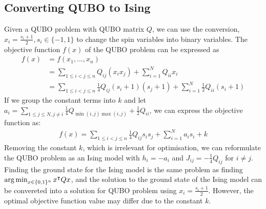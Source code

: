 \subsection{Converting QUBO to Ising}\label{qubotoising}
Given a QUBO problem with QUBO matrix $Q$, we can use the conversion, $x_i = \frac{s_i + 1}{2}, s_i \in \{-1, 1\}$ to change the spin variables into binary variables. The objective function $f(x)$ of the QUBO problem can be expressed as
\begin{align}
    f(x) &= f(x_1, ..., x_n) \nonumber\\
    &= \sum_{1\leq i < j \leq n} Q_{ij}(x_i x_j) + \sum_{i=1}^N Q_{ii} x_i \nonumber \\
    &= \sum_{1\leq i < j \leq n} \frac{1}{4} Q_{ij}(s_i + 1)(s_j + 1) + \sum_{i=1}^N \frac{1}{2} Q_{ii} (s_i + 1) \nonumber
\end{align}
If we group the constant terms into $k$ and let $a_i = \sum_{1\leq j \leq N, j \neq i} \frac{1}{4}Q_{\min(i,j)\max(i,j)} + \frac{1}{2}Q_{ii}$, we can express the objective function as:
\begin{align}
    f(x) = \sum_{1\leq i < j \leq n} \frac{1}{4} Q_{ij}s_i s_j + \sum_{i=1}^N a_i s_i + k \nonumber
\end{align}
Removing the constant $k$, which is irrelevant for optimisation, we can reformulate the QUBO problem as an Ising model with $h_i = -a_i$ and $J_{ij} = -\frac{1}{4}Q_{ij}$ for $i \neq j$. Finding the ground state for the Ising model is the same problem as finding $\operatorname*{arg\,min}_{x \in \{0, 1\}^n} x^\intercal Q x$, and the solution to the ground state of the Ising model can be convereted into a solution for QUBO problem using $x_i = \frac{s_i + 1}{2}$. However, the optimal objective function value may differ due to the constant $k$.

